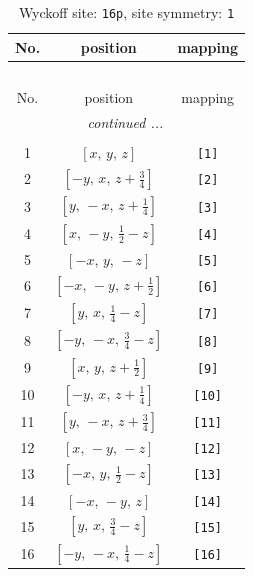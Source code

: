 \documentclass[fleqn,8pt]{jsarticle}
\begin{document}
\begin{longtable}{ccc}
\caption{Wyckoff site: {\tt 16p}, site symmetry: {\tt 1}}
 \\
 \hline \hline
No. & position & mapping \\ \hline \endfirsthead

\multicolumn{2}{l}{\tablename\ \thetable{}} \\
 \hline \hline
No. & position & mapping \\ \hline \endhead

 \hline \hline
\multicolumn{2}{r}{\footnotesize\it continued ...} \\ \endfoot

 \hline \hline
\multicolumn{2}{r}{} \\ \endlastfoot

1 & $\left[ x,\, y,\, z \right]$ & {\tt [1]} \\ \hline
2 & $\left[ - y,\, x,\, z + \frac{3}{4} \right]$ & {\tt [2]} \\ \hline
3 & $\left[ y,\, - x,\, z + \frac{1}{4} \right]$ & {\tt [3]} \\ \hline
4 & $\left[ x,\, - y,\, \frac{1}{2} - z \right]$ & {\tt [4]} \\ \hline
5 & $\left[ - x,\, y,\, - z \right]$ & {\tt [5]} \\ \hline
6 & $\left[ - x,\, - y,\, z + \frac{1}{2} \right]$ & {\tt [6]} \\ \hline
7 & $\left[ y,\, x,\, \frac{1}{4} - z \right]$ & {\tt [7]} \\ \hline
8 & $\left[ - y,\, - x,\, \frac{3}{4} - z \right]$ & {\tt [8]} \\ \hline
9 & $\left[ x,\, y,\, z + \frac{1}{2} \right]$ & {\tt [9]} \\ \hline
10 & $\left[ - y,\, x,\, z + \frac{1}{4} \right]$ & {\tt [10]} \\ \hline
11 & $\left[ y,\, - x,\, z + \frac{3}{4} \right]$ & {\tt [11]} \\ \hline
12 & $\left[ x,\, - y,\, - z \right]$ & {\tt [12]} \\ \hline
13 & $\left[ - x,\, y,\, \frac{1}{2} - z \right]$ & {\tt [13]} \\ \hline
14 & $\left[ - x,\, - y,\, z \right]$ & {\tt [14]} \\ \hline
15 & $\left[ y,\, x,\, \frac{3}{4} - z \right]$ & {\tt [15]} \\ \hline
16 & $\left[ - y,\, - x,\, \frac{1}{4} - z \right]$ & {\tt [16]} \\
\end{longtable}
\end{document}
